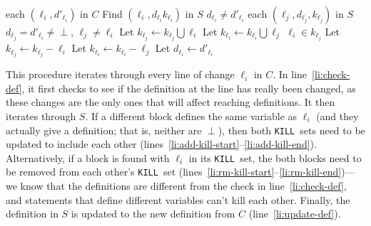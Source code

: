 \documentclass{article}
\let\oldgets\gets
\let\gets\oldgets
\newcommand\bottom{\ensuremath{\perp}}
\newcommand\union{\bigcup}
\newcommand\Kill{\texttt{KILL}}
\begin{document}
\begin{enumerate}
\begin{enumerate}
        \begin{codebox}
          \li \For each $(\ell_i, d'_{\ell_i})$ in $C$
          \li   \Do
                  Find $(\ell_i, d_{\ell_i} k_{\ell_i})$ in $S$
          \li     \If $d_{\ell_i} \ne d'_{\ell_i}$                                         \label{li:check-def}
          \li       \Then
                      \For each $(\ell_j, d_{\ell_j}, k_{\ell_j})$ in $S$
          \li           \Do
                          \If $d_{\ell_j} = d'_{\ell_i} \ne \bottom$, $\ell_j \ne \ell_i$  \label{li:add-kill-start}
          \li               \Then
                              Let $k_{\ell_j} \gets k_{\ell_j} \union \ell_i$
          \li                 Let $k_{\ell_i} \gets k_{\ell_i} \union \ell_j$              \label{li:add-kill-end}
          \li             \ElseIf $\ell_i \in k_{\ell_j}$                                      \label{li:rm-kill-start}
          \li               \Then
                              Let $k_{\ell_j} \gets k_{\ell_j} - \ell_i$
          \li                 Let $k_{\ell_i} \gets k_{\ell_i} - \ell_j$                   \label{li:rm-kill-end}
                          \End
                      \End
          \li         Let $d_{\ell_i} \gets d'_{\ell_i}$                                   \label{li:update-def}
                  \End
              \End
        \end{codebox}

        This procedure iterates through every line of change $\ell_i$
        in $C$.  In line~\ref{li:check-def}, it first checks to see if
        the definition at the line has really been changed, as these
        changes are the only ones that will affect reaching
        definitions. It then iterates through $S$. If a different
        block defines the same variable as $\ell_i$
        (and they actually give a definition; that is, neither are
        \bottom), then both \Kill\ sets need to be updated to include
        each other
        (lines~\ref{li:add-kill-start}--\ref{li:add-kill-end}).
        Alternatively, if a block is found with $\ell_i$ in its \Kill\
        set, the both blocks need to be removed from each other's
        \Kill\ set
        (lines~\ref{li:rm-kill-start}--\ref{li:rm-kill-end})---we know
        that the definitions are different from the check in
        line~\ref{li:check-def}, and statements that define different
        variables can't kill each other. Finally, the definition in
        $S$ is updated to the new definition from $C$
        (line~\ref{li:update-def}).


\end{enumerate}
\end{enumerate}
\end{document}
